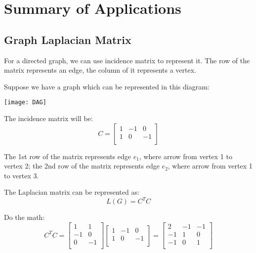 \chapter{Summary of Applications}

\section{Graph Laplacian Matrix}
For a directed graph, we can use incidence matrix to represent it.
The row of the matrix represents an edge, the column of it represents a vertex.

\begin{example}
    Suppose we have a graph which can be represented in this diagram:

    \begin{center}
        \texttt{[image: DAG]}
        \label{fig:simpel-dag}
    \end{center}

    The incidence matrix will be:
   \[
        C = \begin{bmatrix}
            1& -1 & 0 \\
            1 & 0 & -1 \\
        \end{bmatrix}
   \] 

   The 1st row of the matrix represents edge \(e_1\), where arrow from vertex 1 to vertex 2; the 2nd row of the matrix represents edge \(e_2\), where arrow from vertex 1 to vertex 3. 

   The Laplacian matrix can be represented as:
    \[
        L(G) = C^T C
    \]

    Do the math:
    \[
        C^T C = 
        \begin{bmatrix}
            1 &  1 \\
            -1 &  0 \\
            0 &  -1 \\
        \end{bmatrix}
        \begin{bmatrix}
            1 & -1 &  0 \\
            1 & 0 &  -1 \\
        \end{bmatrix}
        =
        \begin{bmatrix}
            2 & -1 &  -1 \\
            -1 & 1 &  0 \\
            -1 & 0 &  1 \\
        \end{bmatrix}
    \] 


\end{example}
